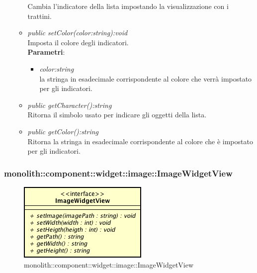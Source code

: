 \begin{itemize}
\begin{itemize}
	Cambia l'indicatore della lista impostando la visualizzazione con i trattini.
	\item \textit{public setColor(color:string):void}\\
	Imposta il colore degli indicatori.
		\\ \textbf{Parametri}: \begin{itemize}
		\item \textit{color:string}\\
		la stringa in esadecimale corrispondente al colore che verrà impostato per gli indicatori.
		\end{itemize} 
	\item \textit{public getCharacter():string}\\
	Ritorna il simbolo usato per indicare gli oggetti della lista.
	\item \textit{public getColor():string}\\
	Ritorna la stringa in esadecimale corrispondente al colore che è impostato per gli indicatori.
	\end{itemize}
\end{itemize}

\subsubsection{monolith::component::widget::image::ImageWidgetView}

\label{monolith::component::widget::image::ImageWidgetView}
\begin{figure}[H]
	\centering
	\includegraphics[scale=0.5]{Sezioni/SottosezioniST/img/ImageWidgetView.png}
	\caption{monolith::component::widget::image::ImageWidgetView}
\end{figure}

